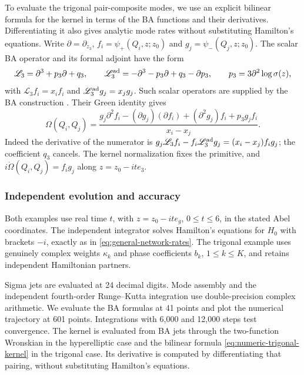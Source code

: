 To evaluate the trigonal pair-composite modes, we use an explicit
bilinear formula for the kernel in terms of the BA functions and
their derivatives. Differentiating it also gives analytic mode rates
without substituting Hamilton's equations.
Write $\partial=\partial_{z_3}$,
$f_i=\psi_+(Q_i,z;z_0)$ and $g_j=\psi_-(Q_j,z;z_0)$.
The scalar BA operator and its formal adjoint have the form
\[
 \mathscr L_3=\partial^3+p_3\partial+q_3,\qquad
 \mathscr L_3^{\rm ad}=-\partial^3-p_3\partial+q_3-\partial p_3,
 \qquad p_3=3\partial^2\log\sigma(z),
\]
with $\mathscr L_3 f_i=x_i f_i$ and
$\mathscr L_3^{\rm ad}g_j=x_jg_j$. Such scalar operators are supplied
by the BA construction \cite{Krichever1977}. Their Green identity gives
\begin{equation}\label{eq:numeric-trigonal-kernel}
 \Omega(Q_i,Q_j)=
 \frac{g_j\partial^2f_i-(\partial g_j)(\partial f_i)
              +(\partial^2g_j)f_i+p_3g_jf_i}{x_i-x_j}.
\end{equation}
Indeed the derivative of the numerator is
$g_j\mathscr L_3 f_i-f_i\mathscr L_3^{\rm ad}g_j
=(x_i-x_j)f_ig_j$; the coefficient $q_3$ cancels.
The kernel normalization fixes the primitive, and
$i\dot\Omega(Q_i,Q_j)=f_ig_j$ along $z=z_0-it e_3$.

\subsubsection{Independent evolution and accuracy}

Both examples use real time $t$, with $z=z_0-it e_g$,
$0\leq t\leq6$, in the stated Abel coordinates. The independent
integrator solves Hamilton's equations for $H_0$ with brackets $-i$,
exactly as in \cref{eq:general-network-rates}. The trigonal example
uses genuinely complex weights $\kappa_k$ and phase coefficients $b_k$,
$1\leq k\leq K$, and retains independent Hamiltonian partners.

Sigma jets are evaluated at 24 decimal digits. Mode assembly and the
independent fourth-order Runge--Kutta integration use double-precision
complex arithmetic. We evaluate the BA formulas at 41 points and
plot the numerical trajectory at 601 points. Integrations with
6,000 and 12,000 steps test convergence. The kernel is evaluated
from BA jets through the two-function Wronskian in the hyperelliptic
case and the bilinear formula \cref{eq:numeric-trigonal-kernel} in the
trigonal case.
Its derivative is computed by differentiating that pairing, without
substituting Hamilton's equations.

